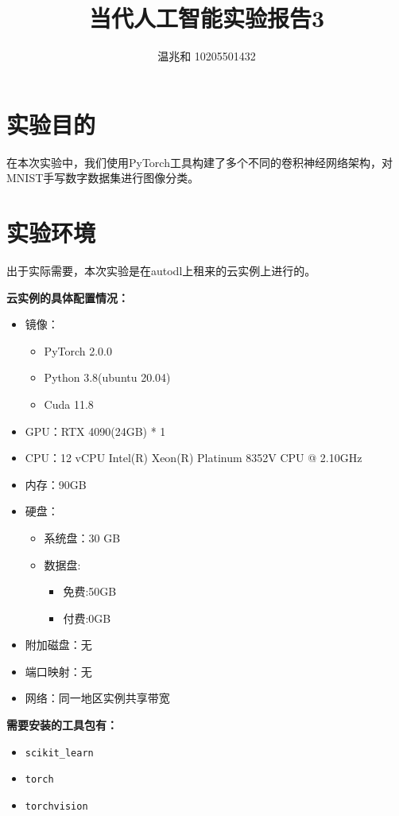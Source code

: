 \documentclass{article}
\title{当代人工智能实验报告3}
\author{温兆和 10205501432}
\begin{document}
\maketitle

\section{实验目的}
在本次实验中，我们使用PyTorch工具构建了多个不同的卷积神经网络架构，对MNIST手写数字数据集进行图像分类。

\section{实验环境}
出于实际需要，本次实验是在autodl上租来的云实例上进行的。

\textbf{云实例的具体配置情况：}
\begin{spacing}{0.5}
\begin{itemize}
\item 镜像：
    \begin{itemize}
        \item PyTorch 2.0.0
        \item Python 3.8(ubuntu 20.04)
        \item Cuda 11.8
    \end{itemize} 
\item GPU：RTX 4090(24GB) * 1 
\item CPU：12 vCPU Intel(R) Xeon(R) Platinum 8352V CPU @ 2.10GHz
\item 内存：90GB
\item 硬盘：
    \begin{itemize}
        \item 系统盘：30 GB
        \item 数据盘:
            \begin{itemize}
                \item 免费:50GB
                \item 付费:0GB
            \end{itemize}
    \end{itemize}
\item 附加磁盘：无
\item 端口映射：无
\item 网络：同一地区实例共享带宽
\end{itemize}
\end{spacing}

\textbf{需要安装的工具包有：}
\begin{spacing}{0.5}
\begin{itemize}
\item \lstinline|scikit_learn|
\item \lstinline|torch|
\item \lstinline|torchvision|
\end{itemize}
\end{spacing}
\end{document}
